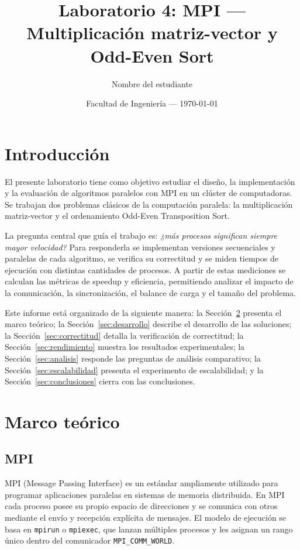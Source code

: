 \documentclass[12pt,a4paper]{article}
\title{Laboratorio 4: MPI --- Multiplicación matriz-vector y Odd-Even Sort}
\author{Nombre del estudiante}
\date{Facultad de Ingeniería --- \today}
\begin{document}
\maketitle
\tableofcontents
\newpage

\section{Introducción}

El presente laboratorio tiene como objetivo estudiar el diseño, la implementación y la evaluación de algoritmos paralelos con MPI en un clúster de computadoras. Se trabajan dos problemas clásicos de la computación paralela: la multiplicación matriz-vector y el ordenamiento Odd-Even Transposition Sort.

La pregunta central que guía el trabajo es: \textit{¿más procesos significan siempre mayor velocidad?} Para responderla se implementan versiones secuenciales y paralelas de cada algoritmo, se verifica su correctitud y se miden tiempos de ejecución con distintas cantidades de procesos. A partir de estas mediciones se calculan las métricas de speedup y eficiencia, permitiendo analizar el impacto de la comunicación, la sincronización, el balance de carga y el tamaño del problema.

Este informe está organizado de la siguiente manera: la Sección~\ref{sec:marco} presenta el marco teórico; la Sección~\ref{sec:desarrollo} describe el desarrollo de las soluciones; la Sección~\ref{sec:correctitud} detalla la verificación de correctitud; la Sección~\ref{sec:rendimiento} muestra los resultados experimentales; la Sección~\ref{sec:analisis} responde las preguntas de análisis comparativo; la Sección~\ref{sec:escalabilidad} presenta el experimento de escalabilidad; y la Sección~\ref{sec:conclusiones} cierra con las conclusiones.

\section{Marco teórico}
\label{sec:marco}

\subsection{MPI}

MPI (Message Passing Interface) es un estándar ampliamente utilizado para programar aplicaciones paralelas en sistemas de memoria distribuida. En MPI cada proceso posee su propio espacio de direcciones y se comunica con otros mediante el envío y recepción explícita de mensajes. El modelo de ejecución se basa en \texttt{mpirun} o \texttt{mpiexec}, que lanzan múltiples procesos y les asignan un rango único dentro del comunicador \texttt{MPI\_COMM\_WORLD}.
\end{document}
